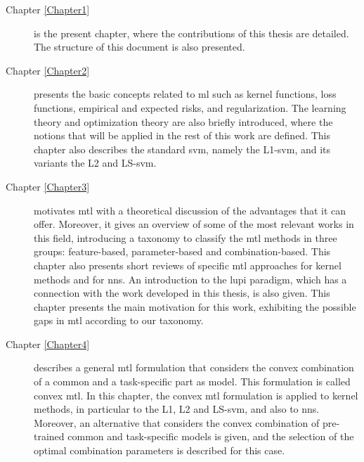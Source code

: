 \begin{description}

\item [{Chapter \ref{Chapter1}}] is the present chapter, where the contributions of this thesis are detailed. The structure of this document is also presented.

\item [{Chapter \ref{Chapter2}}] presents the basic concepts related to \acrshort{ml} such as kernel functions, loss functions, empirical and expected risks, and regularization. The learning theory and optimization theory are also briefly introduced, where the notions that will be applied in the rest of this work are defined. This chapter also describes the standard \acrshort{svm}, namely the L1-\acrshort{svm}, and its variants the L2 and LS-\acrshort{svm}.

\item [{Chapter \ref{Chapter3}}] motivates \acrshort{mtl} with a theoretical discussion of the advantages that it can offer. Moreover, it gives an overview of some of the most relevant works in this field, introducing a taxonomy to classify the \acrshort{mtl} methods in three groups: feature-based, parameter-based and combination-based. This chapter also presents short reviews of specific \acrshort{mtl} approaches for kernel methods and for \acrshort{nns}. An introduction to the \acrfull{lupi} paradigm, which has a connection with the work developed in this thesis, is also given. This chapter presents the main motivation for this work, exhibiting the possible gaps in \acrshort{mtl} according to our taxonomy.



\item [{ Chapter \ref{Chapter4}}] describes a general \acrshort{mtl} formulation that considers the convex combination of a common and a task-specific part as model. This formulation is called convex \acrshort{mtl}. In this chapter, the convex \acrshort{mtl} formulation is applied to kernel methods, in particular to the L1, L2 and LS-\acrshort{svm}, and also to \acrshort{nns}. Moreover, an alternative that considers the convex combination of pre-trained common and task-specific models is given, and the selection of the optimal combination parameters is described for this case.


\end{description}
